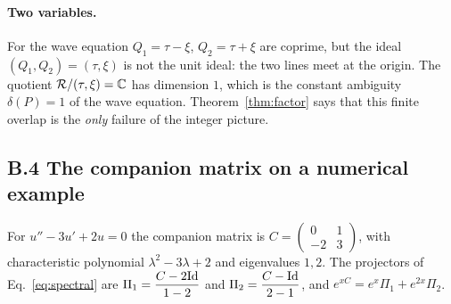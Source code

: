 \paragraph{Two variables.} For the wave equation $Q_1=\tau-\xi$, $Q_2=\tau+\xi$ are coprime, but the ideal $(Q_1,Q_2)=(\tau,\xi)$ is not the unit ideal: the two lines meet at the origin. The quotient $\mathcal{R}/(\tau,\xi)=\mathbb{C}$ has dimension $1$, which is the constant ambiguity $\delta(P)=1$ of the wave equation. Theorem~\ref{thm:factor} says that this finite overlap is the \emph{only} failure of the integer picture.

\subsection*{B.4 The companion matrix on a numerical example}
For $u''-3u'+2u=0$ the companion matrix is $C=\begin{pmatrix}0&1\\-2&3\end{pmatrix}$, with characteristic polynomial $\lambda^2-3\lambda+2$ and eigenvalues $1,2$. The projectors of Eq.~\eqref{eq:spectral} are $\Pi_1=\dfrac{C-2\mathrm{Id}}{1-2}$ and $\Pi_2=\dfrac{C-\mathrm{Id}}{2-1}$, and $e^{xC}=e^x\Pi_1+e^{2x}\Pi_2$.

